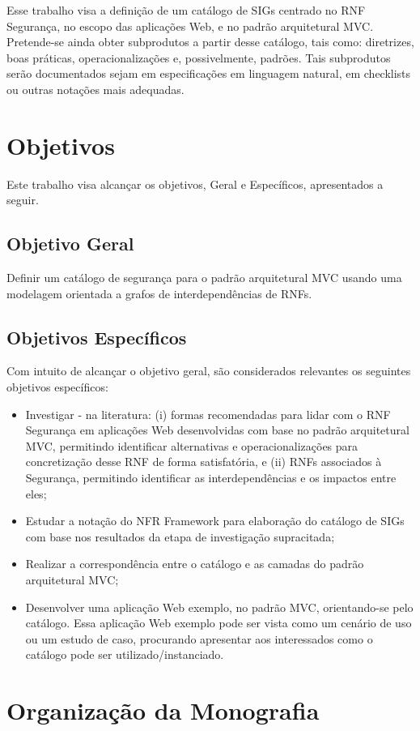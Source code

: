 Esse trabalho visa a definição de um catálogo de SIGs centrado no RNF Segurança, no escopo das aplicações Web, e no padrão arquitetural MVC. Pretende-se ainda obter subprodutos a partir desse catálogo, tais como: diretrizes, boas práticas, operacionalizações e, possivelmente, padrões. Tais subprodutos serão documentados sejam em especificações em linguagem natural, em checklists ou outras notações mais adequadas.

\section{Objetivos}

Este trabalho visa alcançar os objetivos, Geral e Específicos, apresentados a seguir.  

\subsection{Objetivo Geral}

Definir um catálogo de segurança para o padrão arquitetural MVC usando uma modelagem orientada a grafos de interdependências de RNFs. 

\subsection{Objetivos Específicos}

Com intuito de alcançar o objetivo geral, são considerados relevantes os seguintes objetivos específicos:

\begin{itemize}
	
	\item Investigar - na literatura: (i) formas recomendadas para lidar com o RNF Segurança em aplicações Web desenvolvidas com base no padrão arquitetural MVC, permitindo identificar alternativas e operacionalizações para concretização desse RNF de forma satisfatória, e (ii) RNFs associados à Segurança, permitindo identificar as interdependências e os impactos entre eles;
	
	\item Estudar a notação do NFR Framework para elaboração do catálogo de SIGs com base nos resultados da etapa de investigação supracitada;
	
	\item Realizar a correspondência entre o  catálogo e as camadas do padrão arquitetural MVC;
	
	\item Desenvolver uma aplicação Web exemplo, no padrão MVC, orientando-se pelo catálogo. Essa aplicação Web exemplo pode ser vista como um cenário de uso ou um estudo de caso, procurando apresentar aos interessados como o catálogo pode ser utilizado/instanciado. 
	
\end{itemize}

\section{Organização da Monografia}
